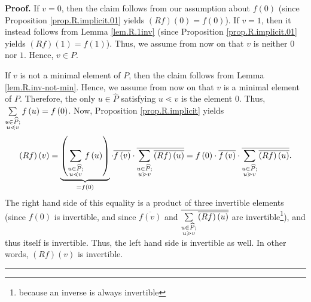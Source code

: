 \documentclass[numbers=enddot,12pt,final,onecolumn,notitlepage]{scrartcl}%
\theoremstyle{definition}
\newenvironment{vershort}{}{}
\newenvironment{proof}[1][Proof]{\noindent\textbf{#1.} }{\ \rule{0.5em}{0.5em}}
\let\sumnonlimits\sum
\renewcommand{\sum}{\sumnonlimits\limits}
\begin{document}
\begin{vershort}
\begin{proof}
If $v=0$, then the claim follows from our assumption about $f\left(  0\right)
$ (since Proposition \ref{prop.R.implicit.01} yields $\left(  Rf\right)
\left(  0\right)  =f\left(  0\right)  $). If $v=1$, then it instead follows
from Lemma \ref{lem.R.1inv} (since Proposition \ref{prop.R.implicit.01} yields
$\left(  Rf\right)  \left(  1\right)  =f\left(  1\right)  $). Thus, we assume
from now on that $v$ is neither $0$ nor $1$. Hence, $v\in P$.

If $v$ is not a minimal element of $P$, then the claim follows from Lemma
\ref{lem.R.inv-not-min}. Hence, we assume from now on that $v$ is a minimal
element of $P$. Therefore, the only $u\in\widehat{P}$ satisfying $u\lessdot v$
is the element $0$. Thus, $\sum\limits_{\substack{u\in\widehat{P};\\u\lessdot
v}}f\left(  u\right)  =f\left(  0\right)  $. Now, Proposition
\ref{prop.R.implicit} yields%
\[
\left(  Rf\right)  \left(  v\right)  =\underbrace{\left(  \sum
\limits_{\substack{u\in\widehat{P};\\u\lessdot v}}f\left(  u\right)  \right)
}_{=f\left(  0\right)  }\cdot\overline{f\left(  v\right)  }\cdot\overline
{\sum\limits_{\substack{u\in\widehat{P};\\u\gtrdot v}}\overline{\left(
Rf\right)  \left(  u\right)  }}=f\left(  0\right)  \cdot\overline{f\left(
v\right)  }\cdot\overline{\sum\limits_{\substack{u\in\widehat{P};\\u\gtrdot
v}}\overline{\left(  Rf\right)  \left(  u\right)  }}.
\]
The right hand side of this equality is a product of three invertible elements
(since $f\left(  0\right)  $ is invertible, and since $\overline{f\left(
v\right)  }$ and $\overline{\sum\limits_{\substack{u\in\widehat{P};\\u\gtrdot
v}}\overline{\left(  Rf\right)  \left(  u\right)  }}$ are
invertible\footnote{because an inverse is always invertible}), and thus itself
is invertible. Thus, the left hand side is invertible as well. In other words,
$\left(  Rf\right)  \left(  v\right)  $ is invertible.
\end{proof}
\end{vershort}
\end{document}
